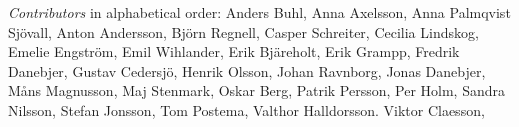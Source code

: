 \emph{Contributors} in alphabetical order:
Anders Buhl,
Anna Axelsson,
Anna Palmqvist Sjövall,
Anton Andersson,
Björn Regnell,
Casper Schreiter,
Cecilia Lindskog,
Emelie Engström,
Emil Wihlander,
Erik Bjäreholt,
Erik Grampp,
Fredrik Danebjer,
Gustav Cedersjö,
Henrik Olsson,
Johan Ravnborg,
Jonas Danebjer, 
Måns Magnusson,
Maj Stenmark,
Oskar Berg,
Patrik Persson,
Per Holm,
Sandra Nilsson,
Stefan Jonsson,
Tom Postema,
Valthor Halldorsson. 
Viktor Claesson,
